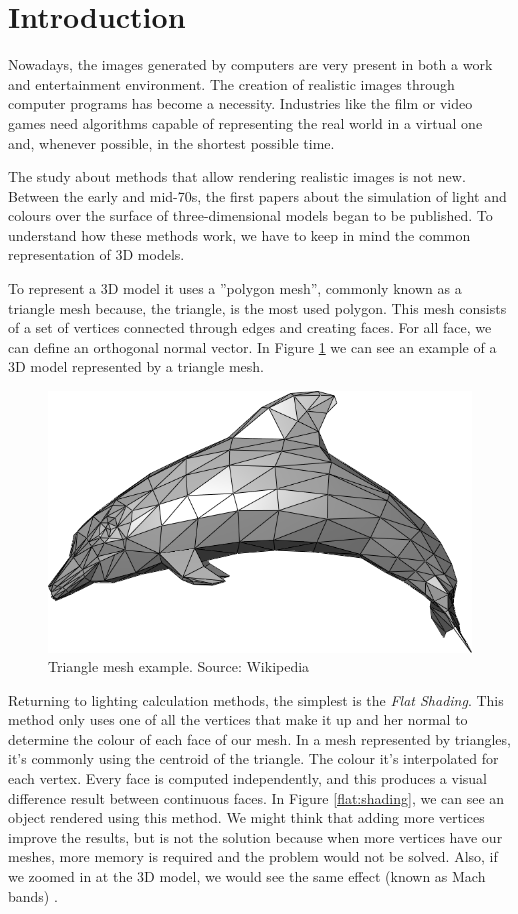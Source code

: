 \documentclass[titlepage,12pt]{report}
\begin{document}
\section{Introduction} \label{introduction}

Nowadays, the images generated by computers are very present in both a work and entertainment environment. The creation of realistic images through computer programs has become a necessity. Industries like the film or video games need algorithms capable of representing the real world in a virtual one and, whenever possible, in the shortest possible time.

The study about methods that allow rendering realistic images is not new. Between the early and mid-70s, the first papers about the simulation of light and colours over the surface of three-dimensional models began to be published. To understand how these methods work, we have to keep in mind the common representation of 3D models.

To represent a 3D model it uses a ''polygon mesh'', commonly known as a triangle mesh because, the triangle, is the most used polygon. This mesh consists of a set of vertices connected through edges and creating faces.  For all face, we can define an orthogonal normal vector. In Figure \ref{dolphin} we can see an example of a 3D model represented by a triangle mesh.

\begin{figure}[H]
	\centering
	\includegraphics[scale=0.15]{media/Dolphin_triangle_mesh.png}
	\caption{Triangle mesh example. Source: Wikipedia}
	\label{dolphin}
\end{figure}

Returning to lighting calculation methods, the simplest is the \textit{Flat Shading}. This method only uses one of all the vertices that make it up and her normal to determine the colour of each face of our mesh. In a mesh represented by triangles, it's commonly using the centroid of the triangle. The colour it's interpolated for each vertex. Every face is computed independently, and this produces a visual difference result between continuous faces. In Figure \ref{flat:shading}, we can see an object rendered using this method. We might think that adding more vertices improve the results, but is not the solution because when more vertices have our meshes, more memory is required and the problem would not be solved. Also, if we zoomed in at the 3D model, we would see the same effect (known as Mach bands) \citep[pp.~5245--5250]{Lotto1999}.
\end{document}
